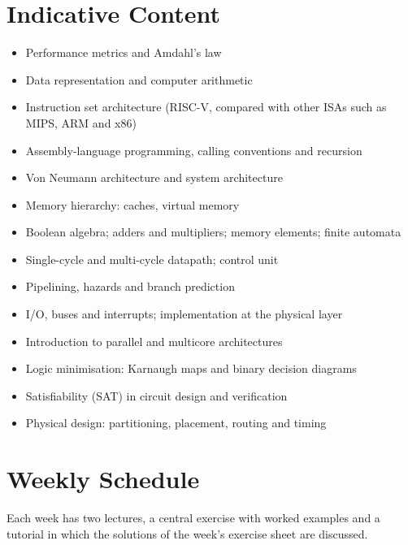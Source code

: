 \documentclass[11pt,a4paper]{article}
\begin{document}
\section{Indicative Content}
\begin{itemize}
  \item Performance metrics and Amdahl's law
  \item Data representation and computer arithmetic
  \item Instruction set architecture (RISC-V, compared with other ISAs such as MIPS,
        ARM and x86)
  \item Assembly-language programming, calling conventions and recursion
  \item Von Neumann architecture and system architecture
  \item Memory hierarchy: caches, virtual memory
  \item Boolean algebra; adders and multipliers; memory elements; finite automata
  \item Single-cycle and multi-cycle datapath; control unit
  \item Pipelining, hazards and branch prediction
  \item I/O, buses and interrupts; implementation at the physical layer
  \item Introduction to parallel and multicore architectures
  \item Logic minimisation: Karnaugh maps and binary decision diagrams
  \item Satisfiability (SAT) in circuit design and verification
  \item Physical design: partitioning, placement, routing and timing
\end{itemize}

\section{Weekly Schedule}
Each week has two lectures, a central exercise with worked examples and a tutorial
in which the solutions of the week's exercise sheet are discussed.
\end{document}

